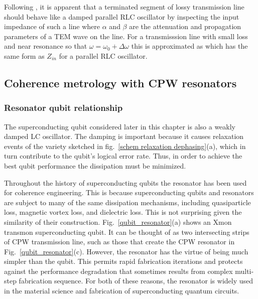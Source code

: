 Following  \cite{Pozar}, it is apparent that a terminated segment of lossy transmission line should behave like a damped parallel RLC oscillator by inspecting the input impedance of such a line
where $\alpha$ and $\beta$ are the attenuation and propagation parameters of a TEM wave on the line.
For a transmisssion line with small loss and near resonance so that $\omega = \omega_0 + \Delta \omega$ this is approximated as
which has the same form as $Z_{in}$ for a parallel RLC oscillator.

\subsection{Coherence metrology with CPW resonators}

\subsubsection{Resonator qubit relationship}

The superconducting qubit considered later in this chapter is also a weakly damped LC oscillator.
The damping is important because it causes relaxation events of the variety sketched in fig.~\ref{schem relaxation dephasing}(a),
which in turn contribute to the qubit's logical error rate.
Thus, in order to achieve the best qubit performance the dissipation must be minimized.

Throughout the history of superconducting qubits the resonator has been used for coherence engineering.
This is because superconducting qubits and resonators are subject to many of the same dissipation mechanisms,
including quasiparticle loss, magnetic vortex loss, and dielectric loss.
This is not surprising given the similarity of their construction.
Fig.~\ref{qubit_resonator}(a) shows an Xmon transmon superconducting qubit.
It can be thought of as two intersecting strips of CPW transmission line,
such as those that create the CPW resonator in Fig.~\ref{qubit_resonator}(c).
However, the resonator has the virtue of being much simpler than the qubit.
This permits rapid fabrication iterations and protects against the performance degradation that sometimes results from complex multi-step fabrication sequence.
For both of these reasons, the resonator is widely used in the material science and fabrication of superconducting quantum circuits.

